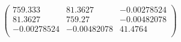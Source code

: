 \documentclass{article}
\begin{document}
\[\left(
\begin{array}{ccc}
 759.333 & 81.3627 & -0.00278524 \\
 81.3627 & 759.27 & -0.00482078 \\
 -0.00278524 & -0.00482078 & 41.4764 \\
\end{array}
\right)\]
\end{document}
